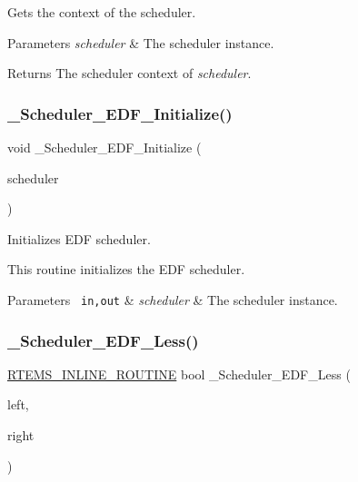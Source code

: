 Gets the context of the scheduler. 


\begin{DoxyParams}{Parameters}
{\em scheduler} & The scheduler instance.\\
\hline
\end{DoxyParams}
\begin{DoxyReturn}{Returns}
The scheduler context of {\itshape scheduler}. 
\end{DoxyReturn}
\mbox{\label{group__RTEMSScoreSchedulerEDF_ga8648861ae22830f1cfcddf7132b6163a}} 
\subsubsection{\texorpdfstring{\_Scheduler\_EDF\_Initialize()}{\_Scheduler\_EDF\_Initialize()}}
{\footnotesize\ttfamily void \+\_\+\+Scheduler\+\_\+\+E\+D\+F\+\_\+\+Initialize (\begin{DoxyParamCaption}\item[{const \mbox{\hyperlink{struct__Scheduler__Control}{Scheduler\+\_\+\+Control}} $\ast$}]{scheduler }\end{DoxyParamCaption})}



Initializes E\+DF scheduler. 

This routine initializes the E\+DF scheduler.


\begin{DoxyParams}[1]{Parameters}
\mbox{\texttt{ in,out}}  & {\em scheduler} & The scheduler instance. \\
\hline
\end{DoxyParams}
\mbox{\label{group__RTEMSScoreSchedulerEDF_gaab4da8d09d44a461c48bfa4132784f71}} 
\subsubsection{\texorpdfstring{\_Scheduler\_EDF\_Less()}{\_Scheduler\_EDF\_Less()}}
{\footnotesize\ttfamily \mbox{\hyperlink{group__RTEMSScoreBaseDefs_gac216239df231d5dbd15e3520b0b9313f}{R\+T\+E\+M\+S\+\_\+\+I\+N\+L\+I\+N\+E\+\_\+\+R\+O\+U\+T\+I\+NE}} bool \+\_\+\+Scheduler\+\_\+\+E\+D\+F\+\_\+\+Less (\begin{DoxyParamCaption}\item[{const void $\ast$}]{left,  }\item[{const \mbox{\hyperlink{structRBTree__Node}{R\+B\+Tree\+\_\+\+Node}} $\ast$}]{right }\end{DoxyParamCaption})}



